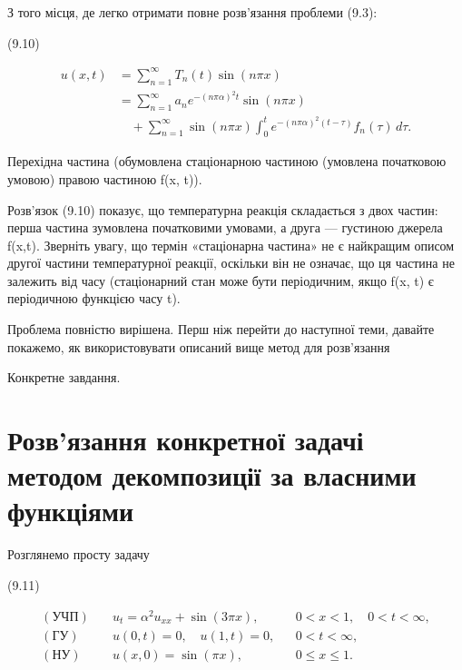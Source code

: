 \documentclass[
  ukrainian,
]{article}
\begin{document}
З того місця, де легко отримати повне розв'язання проблеми (9.3):

(9.10)

\[
\begin{aligned}
u(x, t) &= \sum_{n=1}^{\infty} T_n(t)\sin(n\pi x) \\
&= \sum_{n=1}^{\infty} a_n e^{-(n\pi\alpha)^2 t}\sin(n\pi x) \\
&\quad + \sum_{n=1}^{\infty} \sin(n\pi x)\int_0^t e^{-(n\pi\alpha)^2 (t-\tau)} f_n(\tau)\,d\tau.
\end{aligned}
\]

Перехідна частина (обумовлена стаціонарною частиною (умовлена початковою
умовою) правою частиною f(x, t)).

Розв'язок (9.10) показує, що температурна реакція складається з двох
частин: перша частина зумовлена початковими умовами, а друга ---
густиною джерела f(x,t). Зверніть увагу, що термін «стаціонарна частина»
не є найкращим описом другої частини температурної реакції, оскільки він
не означає, що ця частина не залежить від часу (стаціонарний стан може
бути періодичним, якщо f(x, t) є періодичною функцією часу t).

Проблема повністю вирішена. Перш ніж перейти до наступної теми, давайте
покажемо, як використовувати описаний вище метод для розв'язання

Конкретне завдання.

\section{Розв'язання конкретної задачі методом декомпозиції за власними
функціями}\label{ux440ux43eux437ux432ux44fux437ux430ux43dux43dux44f-ux43aux43eux43dux43aux440ux435ux442ux43dux43eux457-ux437ux430ux434ux430ux447ux456-ux43cux435ux442ux43eux434ux43eux43c-ux434ux435ux43aux43eux43cux43fux43eux437ux438ux446ux456ux457-ux437ux430-ux432ux43bux430ux441ux43dux438ux43cux438-ux444ux443ux43dux43aux446ux456ux44fux43cux438}

Розглянемо просту задачу

(9.11)

\[
\begin{aligned}
(\text{УЧП})\quad & u_t = \alpha^2 u_{xx} + \sin(3\pi x), && 0 < x < 1,\quad 0 < t < \infty, \\
(\text{ГУ})\quad & u(0,t)=0,\quad u(1,t)=0, && 0 < t < \infty, \\
(\text{НУ})\quad & u(x,0)=\sin(\pi x), && 0 \le x \le 1.
\end{aligned}
\]
\end{document}
